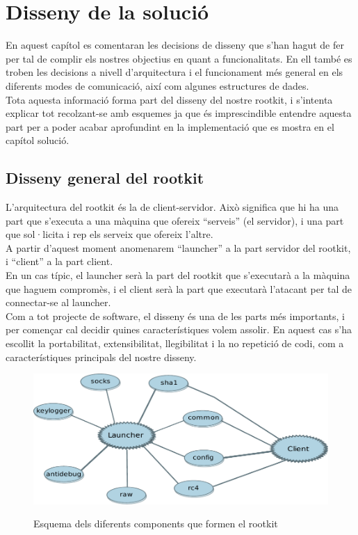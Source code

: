 \chapter{Disseny de la solució}

En aquest capítol es comentaran les decisions de disseny que s'han hagut de fer per tal de complir els 
nostres objectius en quant a funcionalitats. En ell també es troben les decisions a nivell d'arquitectura
i el funcionament més general en els diferents modes de comunicació, així com algunes estructures de dades. \\

Tota aquesta informació forma part del disseny del nostre rootkit, i s'intenta explicar tot recolzant-se
amb esquemes ja que és imprescindible entendre aquesta part per a poder acabar aprofundint en la 
implementació que es mostra en el capítol solució. \\

\section{Disseny general del rootkit}

L'arquitectura del rootkit és la de client-servidor. Això significa que hi ha una part que 
s'executa a una màquina que ofereix ``serveis'' (el servidor), i una part que sol·licita i
rep els serveix que ofereix l'altre. \\

A partir d'aquest moment anomenarem ``launcher'' a la part servidor del rootkit, i ``client''
a la part client. \\

En un cas típic, el launcher serà la part del rootkit que s'executarà a la màquina que haguem 
compromès, i el client serà la part que executarà l'atacant per tal de connectar-se al launcher. \\

Com a tot projecte de software, el disseny és una de les parts més importants, i per començar 
cal decidir quines característiques volem assolir. En aquest cas s'ha escollit la portabilitat, 
extensibilitat, llegibilitat i la no repetició de codi, com a característiques principals del 
nostre disseny. \\

\begin{figure}[htp]
    \centering
        \includegraphics[scale=0.7,keepaspectratio]{diagrames/solutionDesignModules.pdf} \\
    \caption{Esquema dels diferents components que formen el rootkit}
    \label{fig:rootkitModules}
\end{figure}

